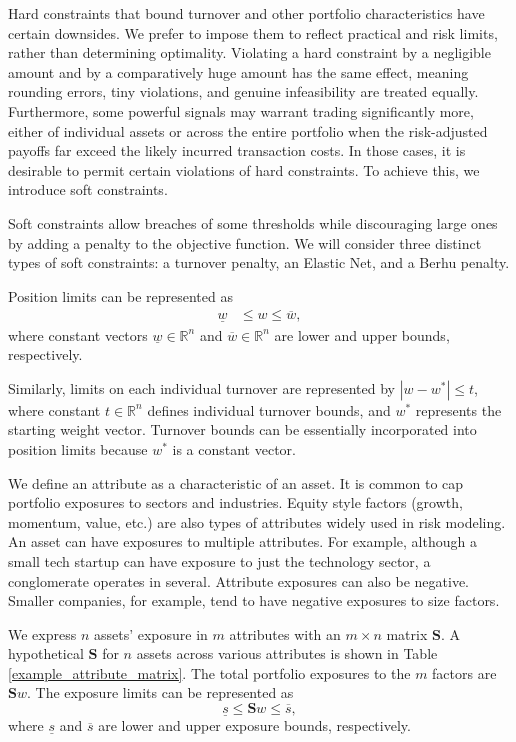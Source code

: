 \documentclass[11pt, letterpaper]{article}
\begin{document}
Hard constraints that bound turnover and other portfolio characteristics have certain downsides. We prefer to impose them to
reflect practical and risk limits, rather than determining optimality. Violating a hard constraint by a negligible amount and by a
comparatively huge amount has the same effect, meaning rounding errors, tiny violations, and genuine infeasibility are
treated equally. Furthermore, some powerful signals may warrant trading significantly more, either of individual assets or
across the entire portfolio when the risk-adjusted payoffs far exceed the likely incurred transaction costs. In those cases, it is
desirable to permit certain violations of hard constraints. To achieve this, we introduce soft constraints.

Soft constraints allow breaches of some thresholds while discouraging large ones by adding a penalty to the objective function. We
will consider three distinct types of soft constraints: a turnover penalty, an Elastic Net, and a Berhu penalty.

Position limits can be represented as
\begin{align*}
    \underline{w} & \leq w \leq \overline{w},
\end{align*}
where constant vectors $\underline{w} \in \mathds{R}^n$ and $\overline{w} \in \mathds{R}^n$ are lower and upper bounds, respectively.

Similarly, limits on each individual turnover are represented by $|w - w^*| \leq t$, where constant $t \in \mathds{R}^n$ defines
individual turnover bounds, and $w^*$ represents the starting weight vector. Turnover bounds can be essentially incorporated
into position limits because $w^*$ is a constant vector.

We define an attribute as a characteristic of an asset. It is common to cap portfolio exposures to sectors and
industries. Equity style factors (growth, momentum, value, etc.) are also types of attributes widely used in risk modeling. An
asset can have exposures to multiple attributes. For example, although a small tech startup can have exposure to just the
technology sector, a conglomerate operates in several. Attribute exposures can also be negative. Smaller companies, for example,
tend to have negative exposures to size factors.

We express $n$ assets' exposure in $m$ attributes with an $m\times n$ matrix $\mathbf{S}$. A hypothetical $\mathbf{S}$ for $n$
assets across various attributes is shown in Table \ref{example_attribute_matrix}.  The total portfolio exposures to the $m$
factors are $\mathbf{S}w$. The exposure limits can be represented as
\begin{equation}
    \underline{s} \leq \mathbf{S}w \leq \overline{s},
\end{equation}
where $\underline{s}$ and $\overline{s}$ are lower and upper exposure bounds, respectively.
\end{document}
